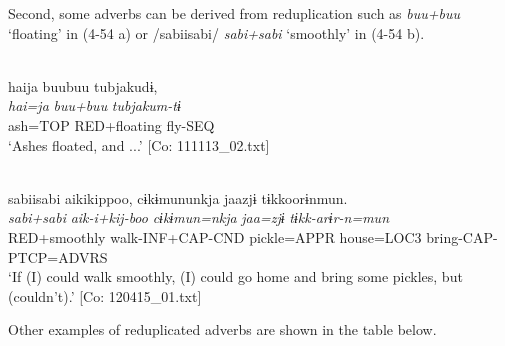 Second, some adverbs can be derived from reduplication such as \textit{buu+buu} ‘floating’ in (4-54 a) or /sabiisabi/ \textit{sabi+sabi} ‘smoothly’ in (4-54 b).

\ea  \label{ex:4.54}
\ea{}\\\label{ex:4.54a}
\glll    haija  buubuu  tubjakudɨ,\\
      \textit{hai=ja}  \textit{buu+buu}  \textit{tubjakum-tɨ}\\
      ash=TOP  RED+floating  fly-SEQ\\
    \glt       ‘Ashes floated, and ...’ [Co: 111113\_02.txt]

\ex{}\\\label{ex:4.54b}
\glll sabiisabi  aikikippoo,  cɨkɨmununkja  jaazjɨ  tɨkkoorɨnmun.\\
      \textit{sabi+sabi}  \textit{aik-i+kij-boo}  \textit{cɨkɨmun=nkja}  \textit{jaa=zjɨ}  \textit{tɨkk-arɨr-n=mun}\\
      RED+smoothly  walk-INF+CAP-CND  pickle=APPR   house=LOC3  bring-CAP-PTCP=ADVRS\\      
      \glt ‘If (I) could walk smoothly, (I) could go home and bring some pickles, but (couldn’t).’   [Co: 120415\_01.txt]
    \z
\z

Other examples of reduplicated adverbs are shown in the table below.


